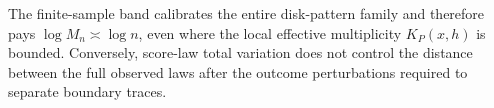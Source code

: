 The finite-sample band calibrates the entire disk-pattern family and therefore pays \(\log M_n\asymp\log n\), even where the local effective multiplicity \(K_P(x,h)\) is bounded. Conversely, score-law total variation does not control the distance between the full observed laws after the outcome perturbations required to separate boundary traces.